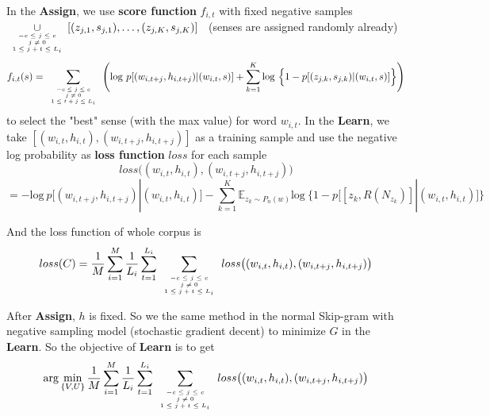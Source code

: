 In the \textbf{Assign}, we use \textbf{score function} $f_{i,t}$ with fixed negative samples\\
 $\displaystyle{\mathop{\cup}_{\mbox{\tiny$\begin{array}{c}-c\leq j \leq c\\ j\neq 0\\ 1\leq j+t\leq L_i\end{array}$}}}[(z_{j,1},s_{j,1}),\ldots,(z_{j,K},s_{j,K})]$ \ (senses are assigned randomly already)
$$f_{i,t}(s) = \sum\limits_{\mbox{\tiny$\begin{array}{c}-c\leq j \leq c\\ j\neq 0\\ 1\leq t+j\leq L_i\end{array}$}}\Bigg (\mathrm{log}\ p[(w_{i,t+j},h_{i,t+j})|(w_{i,t},s) ]+\sum\limits_{k=1}^K\mathrm{log}\ \Big \{1-p[(z_{j,k},s_{j,k})|(w_{i,t},s)] \Big \} \Bigg )$$ 
to select the "best" sense (with the max value) for word $w_{i,t}$. 
In the \textbf{Learn}, we take $[ (w_{i,t},h_{i,t}),(w_{i,t+j},h_{i,t+j})]$ as a training sample and use the negative log probability as \textbf{loss function} $loss$ for each sample 
$$loss\big ( (w_{i,t},h_{i,t}),(w_{i,t+j},h_{i,t+j})\big )$$
$$ = -\mathrm{log}\ p\Big [(w_{i,t+j},h_{i,t+j})|(w_{i,t},h_{i,t})\Big ]-\sum\limits_{k=1}^K\mathbb{E}_{z_k\sim P_n(w)}\mathrm{log}\ \Big \{1-p\Big[[z_k,R(N_{z_k})]|(w_{i,t},h_{i,t})\Big ] \Big \}$$ 

And the loss function of whole corpus is $$loss(C)=\frac{1}{M}\sum_{i=1}^M\frac{1}{L_i}\sum_{t=1}^{L_i}\sum\limits_{\mbox{\tiny$\begin{array}{c}-c\leq j \leq c\\ j\neq 0\\ 1\leq j+t\leq L_i\end{array}$}}loss\big ( (w_{i,t},h_{i,t}),(w_{i,t+j},h_{i,t+j})\big )$$

	After \textbf{Assign}, $h$ is fixed. So we the same method in the normal Skip-gram with negative sampling model (stochastic gradient decent) to minimize $G$ in the \textbf{Learn}. So the objective of \textbf{Learn} is to get 
	$$\arg\min_{\{V,U\}} \frac{1}{M}\sum_{i=1}^M\frac{1}{L_i}\sum_{t=1}^{L_i}\sum\limits_{\mbox{\tiny$\begin{array}{c}-c\leq j \leq c\\ j\neq 0\\ 1\leq j+t\leq L_i\end{array}$}}loss\big ( (w_{i,t},h_{i,t}),(w_{i,t+j},h_{i,t+j})\big )$$



